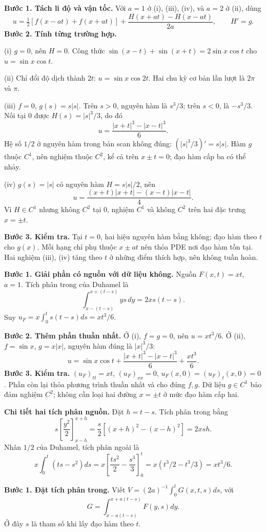 \textbf{Bước 1. Tách li độ và vận tốc.} Với $a=1$ ở (i), (iii), (iv), và $a=2$ ở (ii), dùng
\[u=\tfrac12[f(x-at)+f(x+at)]+\frac{H(x+at)-H(x-at)}{2a},\qquad H'=g.\]
\textbf{Bước 2. Tính từng trường hợp.}

(i) $g=0$, nên $H=0$. Công thức $\sin(x-t)+\sin(x+t)=2\sin x\cos t$ cho $u=\sin x\cos t$.

(ii) Chỉ đổi độ dịch thành $2t$: $u=\sin x\cos2t$. Hai chu kỳ cơ bản lần lượt là $2\pi$ và $\pi$.

(iii) $f=0$, $g(s)=s|s|$. Trên $s>0$, nguyên hàm là $s^3/3$; trên $s<0$, là $-s^3/3$. Nối tại $0$ được $H(s)=|s|^3/3$, do đó
\[u=\frac{|x+t|^3-|x-t|^3}{6}.\]
Hệ số $1/2$ ở nguyên hàm trong bản scan không đúng: $(|s|^3/3)'=s|s|$. Hàm $g$ thuộc $C^1$, nên nghiệm thuộc $C^2$, kể cả trên $x\pm t=0$; đạo hàm cấp ba có thể nhảy.

(iv) $g(s)=|s|$ có nguyên hàm $H=s|s|/2$, nên
\[u=\frac{(x+t)|x+t|-(x-t)|x-t|}{4}.\]
Vì $H\in C^1$ nhưng không $C^2$ tại $0$, nghiệm $C^1$ và không $C^2$ trên hai đặc trưng $x=\pm t$.

\textbf{Bước 3. Kiểm tra.} Tại $t=0$, hai hiệu nguyên hàm bằng không; đạo hàm theo $t$ cho $g(x)$. Mỗi hạng chỉ phụ thuộc $x\pm at$ nên thỏa PDE nơi đạo hàm tồn tại. Hai nghiệm (iii), (iv) tăng theo $t$ ở những điểm thích hợp, nên không tuần hoàn.

\textbf{Bước 1. Giải phần có nguồn với dữ liệu không.} Nguồn $F(x,t)=xt$, $a=1$. Tích phân trong của Duhamel là
\[\int_{x-(t-s)}^{x+(t-s)}ys\,dy=2xs(t-s).\]
Suy $u_F=x\int_0^t s(t-s)ds=xt^3/6$.

\textbf{Bước 2. Thêm phần thuần nhất.} Ở (i), $f=g=0$, nên $u=xt^3/6$. Ở (ii), $f=\sin x$, $g=x|x|$, nguyên hàm đúng là $|x|^3/3$:
\[u=\sin x\cos t+\frac{|x+t|^3-|x-t|^3}{6}+\frac{xt^3}{6}.\]
\textbf{Bước 3. Kiểm tra.} $(u_F)_{tt}=xt$, $(u_F)_{xx}=0$, $u_F(x,0)=(u_F)_t(x,0)=0$. Phần còn lại thỏa phương trình thuần nhất và cho đúng $f,g$. Dữ liệu $g\in C^1$ bảo đảm nghiệm $C^2$; không cần loại hai đường $x=\pm t$ ở mức đạo hàm cấp hai.

\textbf{Chi tiết hai tích phân nguồn.} Đặt $h=t-s$. Tích phân trong bằng
\[s\left[\frac{y^2}{2}\right]_{x-h}^{x+h}
=\frac s2[(x+h)^2-(x-h)^2]=2xsh.\]
Nhân $1/2$ của Duhamel, tích phân ngoài là
\[x\int_0^t(ts-s^2)ds=x\left[\frac{ts^2}{2}-\frac{s^3}{3}\right]_0^t
=x(t^3/2-t^3/3)=xt^3/6.\]

\textbf{Bước 1. Đặt tích phân trong.} Viết $V=(2a)^{-1}\int_0^t G(x,t,s)ds$, với
\[G=\int_{x-a(t-s)}^{x+a(t-s)}F(y,s)dy.\]
Ở đây $s$ là tham số khi lấy đạo hàm theo $t$.

